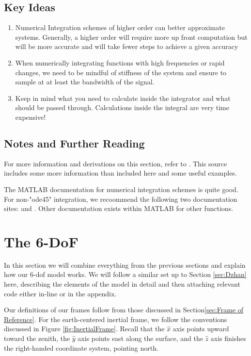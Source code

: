 \documentclass[12pt]{report}
\begin{document}
\section{Key Ideas}
\begin{enumerate}
    \item Numerical Integration schemes of higher order can better approximate systems. Generally, a higher order will require more up front computation but will be more accurate and will take fewer steps to achieve a given accuracy
    \item When numerically integrating functions with high frequencies or rapid changes, we need to be mindful of stiffness of the system and ensure to sample at at least the bandwidth of the signal.
    \item Keep in mind what you need to calculate inside the integrator and what should be passed through. Calculations inside the integral are very time expensive!
\end{enumerate}

\section{Notes and Further Reading}
For more information and derivations on this section, refer to \cite{trench_31_2020}. This source includes some more information than included here and some useful examples.

The MATLAB documentation for numerical integration schemes is quite good. For non-"ode45" integration, we recoommend the following two documentation sites: \cite{mathworks_choose_2024} and \cite{mathworks_summary_2024}. Other documentation exists within MATLAB for other functions.

\chapter{The 6-DoF}
In this section we will combine everything from the previous sections and explain how our 6-\gls{dof} model works. We will follow a similar set up to Section \ref{sec:Dzhan}  here, describing the elements of the model in detail and then attaching relevant code either in-line or in the appendix.

Our definitions of our frames follow from those discussed in Section\ref{sec:Frame of Reference}. For the earth-centered inertial frame, we follow the conventions discussed in Figure \ref{fig:InertialFrame}. Recall that the $\hat{x}$ axis points upward toward the zenith, the $\hat{y}$ axis points east along the surface, and the $\hat{z}$ axis finishes the right-handed coordinate system, pointing north.
\end{document}
